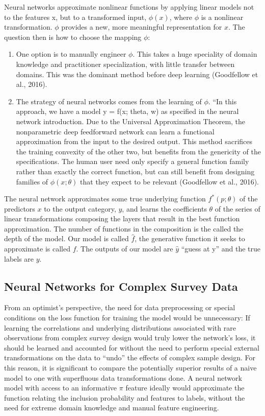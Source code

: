 \documentclass[12pt,twoside]{reedthesis}
\begin{document}
Neural networks approximate nonlinear functions by applying linear
models not to the features x, but to a transformed input, \(\phi(x)\),
where \(\phi\) is a nonlinear transformation. \(\phi\) provides a new,
more meaningful representation for \(x\). The question then is how to
choose the mapping \(\phi\):
\begin{enumerate}
\def\labelenumi{\arabic{enumi}.}
\item
  One option is to manually engineer \(\phi\). This takes a huge
  speciality of domain knowledge and practitioner specialization, with
  little transfer between domains. This was the dominant method before
  deep learning (Goodfellow et al., 2016).
\item
  The strategy of neural networks comes from the learning of \(\phi\).
  ``In this approach, we have a model y = f(x; theta, w) as specified in
  the neural network introduction. Due to the Universal Approximation
  Theorem, the nonparametric deep feedforward network can learn a
  functional approximation from the input to the desired output. This
  method sacrifices the training convexity of the other two, but
  benefits from the genericity of the specifications. The human user
  need only specify a general function family rather than exactly the
  correct function, but can still benefit from designing families of
  \(\phi(x; \theta)\) that they expect to be relevant (Goodfellow et
  al., 2016).
\end{enumerate}
The neural network approximates some true underlying function
\(f^*(p; \theta)\) of the predictors \(x\) to the output category,
\(y\), and learns the coefficients \(\theta\) of the series of linear
transformations composing the layers that result in the best function
approximation. The number of functions in the composition is the called
the depth of the model. Our model is called \(\hat f\), the generative
function it seeks to approximate is called \(f\). The outputs of our
model are \(\hat y\) ``guess at y'' and the true labels are \(y\).

\subsection{Neural Networks for Complex Survey
Data}\label{neural-networks-for-complex-survey-data}

From an optimist's perspective, the need for data preprocessing or
special conditions on the loss function for training the model would be
unnecessary: If learning the correlations and underlying distributions
associated with rare observations from complex survey design would truly
lower the network's loss, it should be learned and accounted for without
the need to perform special external transformations on the data to
``undo'' the effects of complex sample design. For this reason, it is
significant to compare the potentially superior results of a naive model
to one with superfluous data transformations done. A neural network
model with access to an informative \(\pi\) feature ideally would
approximate the function relating the inclusion probability and features
to labels, without the need for extreme domain knowledge and manual
feature engineering.
\end{document}
